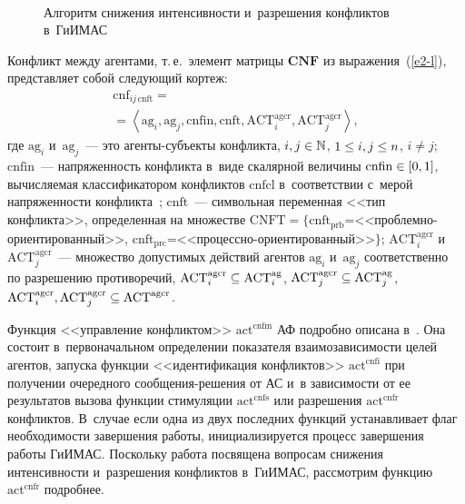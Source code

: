 \begin{multicols}{2}
\begin{figure*}[b] %
  \vspace*{1pt}
  \begin{center}  
    \mbox{%
\epsfxsize=153.979mm
}


\vspace*{6pt}

{\small Алгоритм снижения интенсивности и~разрешения конфликтов в~\mbox{ГиИМАС}}
\end{center}
\end{figure*}
  
  Конфликт между агентами, т.\,е.\ элемент матрицы $\mathbf{CNF}$ из 
выражения~(\ref{e2-l}), представляет собой следующий кортеж:
  \begin{multline}
  \mathrm{cnf}_{i j \,\mathrm{cnft}} ={}\\
  {}=\left\langle  \mathrm{ag}_i, \mathrm{ag}_j, 
  \mathrm{cnfin}, \mathrm{cnft}, \mathrm{ACT}_i^{\mathrm{agcr}}, 
\mathrm{ACT}_j^{\mathrm{agcr}}\right\rangle,
  \label{e3-l}
  \end{multline}
где $\mathrm{ag}_i$ и~$\mathrm{ag}_j$~--- это агенты-субъекты конфликта, $i,j\hm\in 
\mathbb{N}$,  $1\hm\leq i,j\hm\leq n$, $i\not= j$; $\mathrm{cnfin}$~--- напряженность 
конфликта в~виде скалярной величины $\mathrm{cnfin} \hm\in [0,1]$, вычисляемая 
\mbox{классификатором} конфликтов $\mathrm{cnfcl}$ в~соответствии с~мерой напряженности 
конфликта~\cite{4-l}; $\mathrm{cnft}$~--- символьная переменная <<тип конфликта>>, 
определенная на множестве  
$\mathrm{CNFT}=\{\mathrm{cnft}_{\mathrm{prb}}$\;=\;<<проб\-лем\-но-ори\-ен\-ти\-ро\-ван\-ный>>, 
$\mathrm{cnft}_{\mathrm{prc}}$\;=\;<<про\-цес\-сно-ори\-ен\-ти\-ро\-ван\-ный>>$\}$; 
$\mathrm{\mathrm{ACT}}_i^{\mathrm{agcr}}$ и~$\mathrm{ACT}_j^{\mathrm{agcr}}$~--- множество 
допустимых действий агентов $\mathrm{ag}_i$ и~$\mathrm{ag}_j$ соответственно по разрешению 
противоречий, $\mathrm{ACT}_i^{\mathrm{agcr}}\hm\subseteq \mathrm{ACT}_i^{\mathrm{ag}}$, 
$\mathrm{ACT}_j^{\mathrm{agcr}}\hm\subseteq \mathrm{ACT}_j^{\mathrm{ag}}$, 
$\mathrm{ACT}_i^{\mathrm{agcr}}, \mathrm{ACT}_j^{\mathrm{agcr}}\hm\subseteq 
\mathrm{ACT}^{\mathrm{agcr}}$.
  
  Функция <<управление конфликтом>> $\mathrm{act^{cnfm}}$ АФ подробно описана 
в~\cite{4-l}. Она состоит в~первоначальном определении показателя 
взаимоза\-ви\-си\-мости целей агентов, запуска функции <<идентификация 
конфликтов>> $\mathrm{act^{cnfi}}$ при получении очередного со\-об\-ще\-ния-ре\-ше\-ния 
от АС и~в зависимости от ее результатов вызова функции стимуляции 
$\mathrm{act^{cnfs}}$ или разрешения $\mathrm{act^{cnfr}}$ конфликтов. В~случае если одна из 
двух последних функций устанавливает флаг необходимости завершения 
работы, инициализируется процесс завершения работы \mbox{ГиИМАС}. 
Поскольку работа посвящена вопросам снижения интенсивности и~разрешения 
конфликтов в~\mbox{ГиИМАС}, рассмотрим функцию $\mathrm{act^{cnfr}}$ подробнее.
  

\end{multicols}
